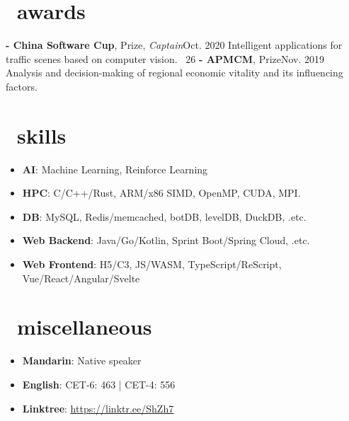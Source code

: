 \documentclass{common}
\begin{document}
\section{\faTrophy\ awards}
\award
    {\textbf{- China Software Cup},  Prize, \textit{Captain}}{Oct. 2020}
    {Intelligent applications for traffic scenes based on computer vision. 
        {\href{https://github.com/Sh-Zh-7/intelligent-transportation-system}{\underline{\faGithub}} \faStarO\ 26}
    }
\award
    {\textbf{- APMCM},  Prize}{Nov. 2019}
    {Analysis and decision-making of regional economic vitality and its influencing factors.}

\section{\faCogs\ skills}
\begin{itemize}[parsep=0.5ex]
    \item \textbf{AI}: Machine Learning, Reinforce Learning
    \item \textbf{HPC}: C/C++/Rust, ARM/x86 SIMD, OpenMP, CUDA, MPI.
    \item \textbf{DB}: MySQL, Redis/memcached, botDB, levelDB, DuckDB, .etc.
    \item \textbf{Web Backend}: Java/Go/Kotlin, Sprint Boot/Spring Cloud, .etc.
    \item \textbf{Web Frontend}: H5/C3, JS/WASM, TypeScript/ReScript, Vue/React/Angular/Svelte
\end{itemize}

\section{\faInfo\ miscellaneous}
\begin{itemize}[parsep=0.5ex]
    \item \textbf{Mandarin}: Native speaker
    \item \textbf{English}: CET-6: 463 | CET-4: 556
    \item \textbf{Linktree}: \href{https://linktr.ee/ShZh7}{\underline{https://linktr.ee/ShZh7}}
\end{itemize}
\end{document}
